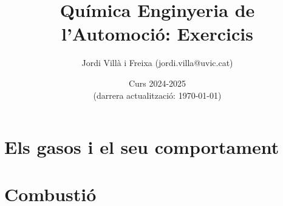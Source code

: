 \documentclass[12pt]{article}
\title{Química Enginyeria de l'Automoció: Exercicis}
\date{Curs 2024-2025\\\small{(darrera actualització: \today)}}
\author{Jordi Vill\`a i Freixa (jordi.villa@uvic.cat)}
\begin{document}
\maketitle
\tableofcontents
\section{Els gasos i el seu comportament} 


\section{Combustió}

% 
% 
% 
% 
% 
\printbibliography
\end{document}
